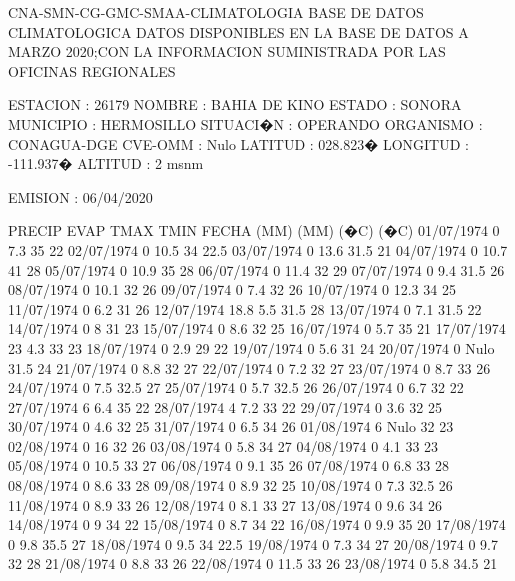 CNA-SMN-CG-GMC-SMAA-CLIMATOLOGIA
BASE DE DATOS CLIMATOLOGICA
DATOS DISPONIBLES EN LA BASE DE DATOS A MARZO 2020;CON LA INFORMACION SUMINISTRADA POR LAS OFICINAS REGIONALES
 
ESTACION  : 26179
NOMBRE    : BAHIA DE KINO
ESTADO    : SONORA
MUNICIPIO : HERMOSILLO
SITUACI�N : OPERANDO
ORGANISMO : CONAGUA-DGE
CVE-OMM   : Nulo
LATITUD   : 028.823�
LONGITUD  : -111.937�
ALTITUD   : 2 msnm
 
EMISION   : 06/04/2020 
 
           PRECIP  EVAP   TMAX   TMIN
  FECHA     (MM)   (MM)   (�C)   (�C)
01/07/1974  0      7.3    35     22 
02/07/1974  0      10.5   34     22.5 
03/07/1974  0      13.6   31.5   21 
04/07/1974  0      10.7   41     28 
05/07/1974  0      10.9   35     28 
06/07/1974  0      11.4   32     29 
07/07/1974  0      9.4    31.5   26 
08/07/1974  0      10.1   32     26 
09/07/1974  0      7.4    32     26 
10/07/1974  0      12.3   34     25 
11/07/1974  0      6.2    31     26 
12/07/1974  18.8   5.5    31.5   28 
13/07/1974  0      7.1    31.5   22 
14/07/1974  0      8      31     23 
15/07/1974  0      8.6    32     25 
16/07/1974  0      5.7    35     21 
17/07/1974  23     4.3    33     23 
18/07/1974  0      2.9    29     22 
19/07/1974  0      5.6    31     24 
20/07/1974  0     Nulo    31.5   24 
21/07/1974  0      8.8    32     27 
22/07/1974  0      7.2    32     27 
23/07/1974  0      8.7    33     26 
24/07/1974  0      7.5    32.5   27 
25/07/1974  0      5.7    32.5   26 
26/07/1974  0      6.7    32     22 
27/07/1974  6      6.4    35     22 
28/07/1974  4      7.2    33     22 
29/07/1974  0      3.6    32     25 
30/07/1974  0      4.6    32     25 
31/07/1974  0      6.5    34     26 
01/08/1974  6     Nulo    32     23 
02/08/1974  0      16     32     26 
03/08/1974  0      5.8    34     27 
04/08/1974  0      4.1    33     23 
05/08/1974  0      10.5   33     27 
06/08/1974  0      9.1    35     26 
07/08/1974  0      6.8    33     28 
08/08/1974  0      8.6    33     28 
09/08/1974  0      8.9    32     25 
10/08/1974  0      7.3    32.5   26 
11/08/1974  0      8.9    33     26 
12/08/1974  0      8.1    33     27 
13/08/1974  0      9.6    34     26 
14/08/1974  0      9      34     22 
15/08/1974  0      8.7    34     22 
16/08/1974  0      9.9    35     20 
17/08/1974  0      9.8    35.5   27 
18/08/1974  0      9.5    34     22.5 
19/08/1974  0      7.3    34     27 
20/08/1974  0      9.7    32     28 
21/08/1974  0      8.8    33     26 
22/08/1974  0      11.5   33     26 
23/08/1974  0      5.8    34.5   21 
